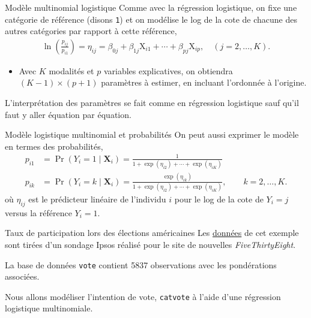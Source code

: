 \documentclass[
  ignorenonframetext,
]{beamer}
\providecommand{\tightlist}{%
  \setlength{\itemsep}{0pt}\setlength{\parskip}{0pt}}\usepackage{longtable,booktabs,array}
\begin{document}
\begin{frame}[fragile]{Modèle multinomial logistique}
\protect\hypertarget{moduxe8le-multinomial-logistique}{}
Comme avec la régression logistique, on fixe une catégorie de référence
(disons \texttt{1}) et on modélise le log de la cote de chacune des
autres catégories par rapport à cette référence, \begin{align*}
 \ln\left(\frac{p_{ij}}{p_{i1}}\right) = \eta_{ij} = \beta_{0j} + \beta_{1j} \mathrm{X}_{i1} + \cdots + \beta_{pj} \mathrm{X}_{ip}, \quad (j=2, \ldots, K).
\end{align*}

\begin{itemize}
\tightlist
\item
  Avec \(K\) modalités et \(p\) variables explicatives, on obtiendra
  \((K-1)\times (p+1)\) paramètres à estimer, en incluant l'ordonnée à
  l'origine.
\end{itemize}

L'interprétation des paramètres se fait comme en régression logistique
sauf qu'il faut y aller équation par équation.
\end{frame}

\begin{frame}{Modèle logistique multinomial et probabilités}
\protect\hypertarget{moduxe8le-logistique-multinomial-et-probabilituxe9s}{}
On peut aussi exprimer le modèle en termes des probabilités,
\begin{align*}
 p_{i1} &= \Pr(Y_i=1 \mid \mathbf{X}_i) = \frac{1}{1+ \exp(\eta_{i2}) + \cdots + \exp(\eta_{iK})}\\
 p_{ik} &= \Pr(Y_i=k \mid \mathbf{X}_i) = \frac{\exp(\eta_{ik})}{1+ \exp(\eta_{i2}) + \cdots + \exp(\eta_{iK})}, \qquad k =2, \ldots, K.
\end{align*} où \(\eta_{ij}\) est le prédicteur linéaire de l'individu
\(i\) pour le log de la cote de \(Y_i=j\) versus la référence \(Y_i=1\).
\end{frame}

\begin{frame}[fragile]{Taux de participation lors des élections
américaines}
\protect\hypertarget{taux-de-participation-lors-des-uxe9lections-amuxe9ricaines}{}
Les
\href{https://github.com/fivethirtyeight/data/tree/master/non-voters}{données}
de cet exemple sont tirées d'un sondage Ipsos réalisé pour le site de
nouvelles \emph{FiveThirtyEight}.

La base de données \texttt{vote} contient 5837 observations avec les
pondérations associées.

Nous allons modéliser l'intention de vote, \texttt{catvote} à l'aide
d'une régression logistique multinomiale.
\end{frame}
\end{document}
